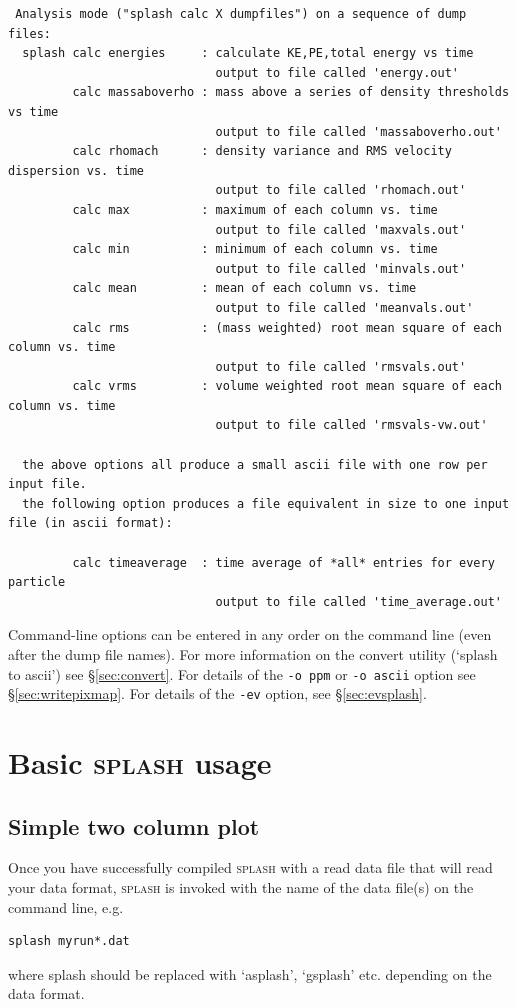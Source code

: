 \documentclass[a4paper,10pt]{article}
\newcommand{\splash}{\textsc{splash }}
\begin{document}
\begin{verbatim}
 Analysis mode ("splash calc X dumpfiles") on a sequence of dump files: 
  splash calc energies     : calculate KE,PE,total energy vs time
                             output to file called 'energy.out'
         calc massaboverho : mass above a series of density thresholds vs time
                             output to file called 'massaboverho.out'
         calc rhomach      : density variance and RMS velocity dispersion vs. time
                             output to file called 'rhomach.out'
         calc max          : maximum of each column vs. time
                             output to file called 'maxvals.out'
         calc min          : minimum of each column vs. time
                             output to file called 'minvals.out'
         calc mean         : mean of each column vs. time
                             output to file called 'meanvals.out'
         calc rms          : (mass weighted) root mean square of each column vs. time
                             output to file called 'rmsvals.out'
         calc vrms         : volume weighted root mean square of each column vs. time
                             output to file called 'rmsvals-vw.out'

  the above options all produce a small ascii file with one row per input file.
  the following option produces a file equivalent in size to one input file (in ascii format):

         calc timeaverage  : time average of *all* entries for every particle
                             output to file called 'time_average.out'
\end{verbatim}

 Command-line options can be entered in any order on the command line (even after the dump file names). For more information on the convert utility (`splash to ascii') see \S\ref{sec:convert}. For details of the \verb+-o ppm+ or \verb+-o ascii+ option see \S\ref{sec:writepixmap}. For details of the \verb+-ev+ option, see \S\ref{sec:evsplash}.

\section{Basic \splash usage}%
\label{sec:basic}

\subsection{Simple two column plot}
 Once you have successfully compiled \splash with a read data file that will read your data format,
\splash is invoked with the name of the data
file(s) on the command line, e.g.
\begin{verbatim}
splash myrun*.dat
\end{verbatim}
where splash should be replaced with `asplash', `gsplash' etc. depending on the data format. \\
\end{document}
